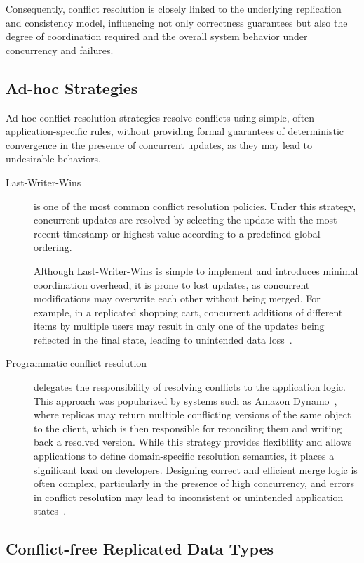 Consequently, conflict resolution is closely linked to the underlying replication and consistency model, influencing not only correctness guarantees but also the degree of coordination required and the overall system behavior under concurrency and failures.

\subsection{Ad-hoc Strategies}
\label{sub:strategies}

Ad-hoc conflict resolution strategies resolve conflicts using simple, often application-specific rules, without providing formal guarantees of deterministic convergence in the presence of concurrent updates, as they may lead to undesirable behaviors.

\begin{description}
    \item[Last-Writer-Wins] is one of the most common conflict resolution policies. Under this strategy, concurrent updates are resolved by selecting the update with the most recent timestamp or highest value according to a predefined global ordering.

          Although Last-Writer-Wins is simple to implement and introduces minimal coordination overhead, it is prone to lost updates, as concurrent modifications may overwrite each other without being merged. For example, in a replicated shopping cart, concurrent additions of different items by multiple users may result in only one of the updates being reflected in the final state, leading to unintended data loss~\cite{shapiro2011comprehensive}.
    \item[Programmatic conflict resolution] delegates the responsibility of resolving conflicts to the application logic. This approach was popularized by systems such as Amazon Dynamo~\cite{dynamo}, where replicas may return multiple conflicting versions of the same object to the client, which is then responsible for reconciling them and writing back a resolved version. While this strategy provides flexibility and allows applications to define domain-specific resolution semantics, it places a significant load on developers. Designing correct and efficient merge logic is often complex, particularly in the presence of high concurrency, and errors in conflict resolution may lead to inconsistent or unintended application states~\cite{kohler2019localfirst}.
\end{description}

\subsection{Conflict-free Replicated Data Types}
\label{sub:crdts}

